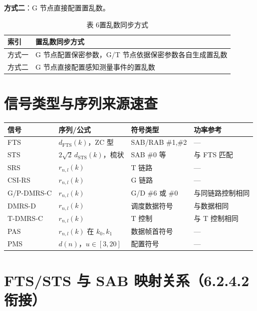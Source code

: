 \documentclass[11pt,a4paper]{ctexart}
\begin{document}
\textbf{方式二}：G 节点直接配置置乱数。

\begin{table}[h]
\centering
\caption{表 6\quad 置乱数同步方式}
\begin{tabular}{ll}
\toprule
\textbf{索引} & \textbf{置乱数同步方式} \\
\midrule
方式一 & G 节点配置保密参数，G/T 节点依据保密参数各自生成置乱数 \\
方式二 & G 节点直接配置感知测量事件的置乱数 \\
\bottomrule
\end{tabular}
\end{table}

\section{信号类型与序列来源速查}

\begin{table}[h]
\centering
\footnotesize
\begin{tabular}{llll}
\toprule
\textbf{信号} & \textbf{序列/公式} & \textbf{符号类型} & \textbf{功率参考} \\
\midrule
FTS & $d_{\mathrm{FTS}}(k)$，ZC 型 & SAB/RAB \#1,\#2 & --- \\
STS & $2\sqrt{2}\, d_{\mathrm{STS}}(k)$，梳状 & SAB \#0 等 & 与 FTS 匹配 \\
SRS & $r_{n,l}(k)$ & T 链路 & --- \\
CSI-RS & $r_{n,l}(k)$ & G 链路 & --- \\
G/P-DMRS-C & $r_{n,l}(k)$ & G/D \#6 或 \#0 & 与同链路控制相同 \\
DMRS-D & $r_{n,l}(k)$ & 调度数据符号 & 与数据相同 \\
T-DMRS-C & $r_{n,l}(k)$ & T 控制 & 与 T 控制相同 \\
PAS & $r_{n,l}(k)$ 在 $k_0,k_1$ & 数据帧首符号 & --- \\
PMS & $d(n)$，$u\in[3,20]$ & 配置符号 & --- \\
\bottomrule
\end{tabular}
\end{table}

\section{FTS/STS 与 SAB 映射关系（6.2.4.2 衔接）}
\end{document}

